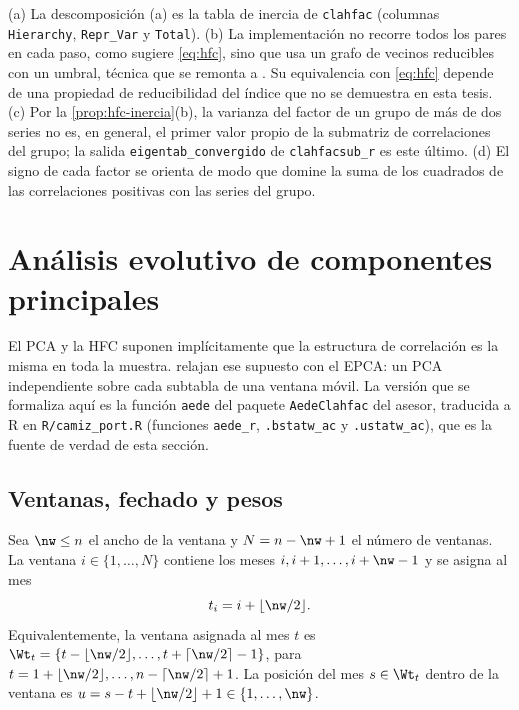 \begin{observacion}\label{obs:hfc-codigo}
(a) La descomposición (a) es la tabla de inercia de \texttt{clahfac} (columnas
\texttt{Hierarchy}, \texttt{Repr\_Var} y \texttt{Total}). (b) La implementación no recorre todos
los pares en cada paso, como sugiere \cref{eq:hfc}, sino que usa un grafo de vecinos reducibles
con un umbral, técnica que se remonta a \textcite{bruynooghe_1978}. Su equivalencia con \cref{eq:hfc} depende de una propiedad de
reducibilidad del índice que no se demuestra en esta tesis. (c) Por la \cref{prop:hfc-inercia}(b), la varianza del factor de un grupo
de más de dos series no es, en general, el primer valor propio de la submatriz de correlaciones del
grupo; la salida \texttt{eigentab\_convergido} de \texttt{clahfacsub\_r} es este último.
(d) El signo de cada factor se orienta de modo que domine la suma de los cuadrados de las
correlaciones positivas con las series del grupo.
\end{observacion}

\section{Análisis evolutivo de componentes principales}
\label{sec:epca}

El PCA y la HFC suponen implícitamente que la estructura de correlación es la misma en toda la
muestra. \textcite{camiz_maulucci_roig_2010} relajan ese supuesto con el EPCA: un PCA
independiente sobre cada subtabla de una ventana móvil. La versión que se formaliza aquí es la
función \texttt{aede} del paquete \texttt{AedeClahfac} del asesor, traducida a R en
\texttt{R/camiz\_port.R} (funciones \texttt{aede\_r}, \texttt{.bstatw\_ac} y \texttt{.ustatw\_ac}),
que es la fuente de verdad de esta sección.

\subsection{Ventanas, fechado y pesos}

\begin{definicion}\label{def:ventana}
Sea $\nw\le n$ el ancho de la ventana y $N=n-\nw+1$ el número de ventanas. La ventana
$i\in\{1,\dots,N\}$ contiene los meses $i,i+1,\dots,i+\nw-1$ y se asigna al mes
\begin{equation}\label{eq:fechado}
  t_i=i+\lfloor\nw/2\rfloor .
\end{equation}
Equivalentemente, la ventana asignada al mes $t$ es
$\Wt_t=\{t-\lfloor\nw/2\rfloor,\dots,t+\lceil\nw/2\rceil-1\}$, para
$t=1+\lfloor\nw/2\rfloor,\dots,n-\lceil\nw/2\rceil+1$. La posición del mes $s\in\Wt_t$ dentro de
la ventana es $u=s-t+\lfloor\nw/2\rfloor+1\in\{1,\dots,\nw\}$.
\end{definicion}

